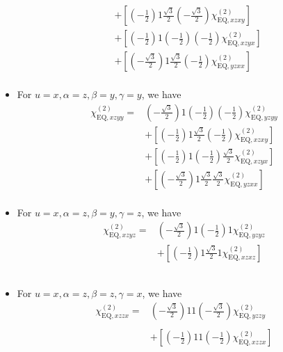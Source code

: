 \documentclass[UTF8,10pt,a4paper]{article}
\begin{document}
\begin{itemize}
\begin{align}
\nonumber&+\left[\left(-\frac{1}{2}\right)1\frac{\sqrt{3}}{2}\left(-\frac{\sqrt{3}}{2}\right)\chi_{\text{EQ},xzxy}^{(2)}\right]\\
\nonumber&+\left[\left(-\frac{1}{2}\right)1\left(-\frac{1}{2}\right)\left(-\frac{1}{2}\right)\chi_{\text{EQ},xzyx}^{(2)}\right]\\
\nonumber&+\left[\left(-\frac{\sqrt{3}}{2}\right)1\frac{\sqrt{3}}{2}\left(-\frac{1}{2}\right)\chi_{\text{EQ},yzxx}^{(2)}\right]\\
&
\end{align}\normalsize
\item For $u=x,\alpha=z,\beta=y,\gamma=y$, we have
\footnotesize\begin{align}
\nonumber\chi_{\text{EQ},xzyy}^{(2)}=&\left(-\frac{\sqrt{3}}{2}\right)1\left(-\frac{1}{2}\right)\left(-\frac{1}{2}\right)\chi_{\text{EQ},yzyy}^{(2)}\\
\nonumber&+\left[\left(-\frac{1}{2}\right)1\frac{\sqrt{3}}{2}\left(-\frac{1}{2}\right)\chi_{\text{EQ},xzxy}^{(2)}\right]\\
\nonumber&+\left[\left(-\frac{1}{2}\right)1\left(-\frac{1}{2}\right)\frac{\sqrt{3}}{2}\chi_{\text{EQ},xzyx}^{(2)}\right]\\
\nonumber&+\left[\left(-\frac{\sqrt{3}}{2}\right)1\frac{\sqrt{3}}{2}\frac{\sqrt{3}}{2}\chi_{\text{EQ},yzxx}^{(2)}\right]\\
&
\end{align}\normalsize
\item For $u=x,\alpha=z,\beta=y,\gamma=z$, we have
\footnotesize\begin{align}
\nonumber\chi_{\text{EQ},xzyz}^{(2)}=&\left(-\frac{\sqrt{3}}{2}\right)1\left(-\frac{1}{2}\right)1\chi_{\text{EQ},yzyz}^{(2)}\\
\nonumber&+\left[\left(-\frac{1}{2}\right)1\frac{\sqrt{3}}{2}1\chi_{\text{EQ},xzxz}^{(2)}\right]\\
\nonumber&\\
\nonumber&\\
&
\end{align}\normalsize
\item For $u=x,\alpha=z,\beta=z,\gamma=x$, we have
\footnotesize\begin{align}
\nonumber\chi_{\text{EQ},xzzx}^{(2)}=&\left(-\frac{\sqrt{3}}{2}\right)11\left(-\frac{\sqrt{3}}{2}\right)\chi_{\text{EQ},yzzy}^{(2)}\\
\nonumber&\\
\nonumber&+\left[\left(-\frac{1}{2}\right)11\left(-\frac{1}{2}\right)\chi_{\text{EQ},xzzx}^{(2)}\right]\\

\end{align}
\end{itemize}
\end{document}
